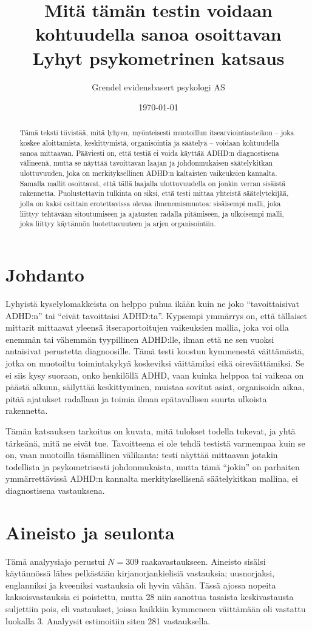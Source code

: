 \documentclass[11pt,a4paper]{article}
\title{Mitä tämän testin voidaan kohtuudella sanoa osoittavan\\
\large Lyhyt psykometrinen katsaus}
\author{Grendel evidensbasert psykologi AS}
\date{\today}
\begin{document}
\maketitle

\begin{abstract}
Tämä teksti tiivistää, mitä lyhyen, myönteisesti muotoillun itsearviointiasteikon -- joka koskee aloittamista, keskittymistä, organisointia ja säätelyä -- voidaan kohtuudella sanoa mittaavan. Pääviesti on, että testiä ei voida käyttää ADHD:n diagnostisena välineenä, mutta se näyttää tavoittavan laajan ja johdonmukaisen säätelykitkan ulottuvuuden, joka on merkityksellinen ADHD:n kaltaisten vaikeuksien kannalta. Samalla mallit osoittavat, että tällä laajalla ulottuvuudella on jonkin verran sisäistä rakennetta. Puolustettavin tulkinta on siksi, että testi mittaa yhteistä säätelytekijää, jolla on kaksi osittain erotettavissa olevaa ilmenemismuotoa: sisäisempi malli, joka liittyy tehtävään sitoutumiseen ja ajatusten radalla pitämiseen, ja ulkoisempi malli, joka liittyy käytännön luotettavuuteen ja arjen organisointiin.
\end{abstract}

\section{Johdanto}
Lyhyistä kyselylomakkeista on helppo puhua ikään kuin ne joko ``tavoittaisivat ADHD:n'' tai ``eivät tavoittaisi ADHD:ta''. Kypsempi ymmärrys on, että tällaiset mittarit mittaavat yleensä itseraportoitujen vaikeuksien mallia, joka voi olla enemmän tai vähemmän tyypillinen ADHD:lle, ilman että ne sen vuoksi antaisivat perustetta diagnoosille. Tämä testi koostuu kymmenestä väittämästä, jotka on muotoiltu toimintakykyä koskeviksi väittämiksi eikä oireväittämiksi. Se ei siis kysy suoraan, onko henkilöllä ADHD, vaan kuinka helppoa tai vaikeaa on päästä alkuun, säilyttää keskittyminen, muistaa sovitut asiat, organisoida aikaa, pitää ajatukset radallaan ja toimia ilman epätavallisen suurta ulkoista rakennetta.

Tämän katsauksen tarkoitus on kuvata, mitä tulokset todella tukevat, ja yhtä tärkeänä, mitä ne eivät tue. Tavoitteena ei ole tehdä testistä varmempaa kuin se on, vaan muotoilla täsmällinen välikanta: testi näyttää mittaavan jotakin todellista ja psykometrisesti johdonmukaista, mutta tämä ``jokin'' on parhaiten ymmärrettävissä ADHD:n kannalta merkityksellisenä säätelykitkan mallina, ei diagnostisena vastauksena.

\section{Aineisto ja seulonta}
Tämä analyysiajo perustui $N = 309$ raakavastaukseen. Aineisto sisälsi käytännössä lähes pelkästään kirjanorjankielisiä vastauksia; uusnorjaksi, englanniksi ja kveeniksi vastauksia oli hyvin vähän. Tässä ajossa nopeita kaksoisvastauksia ei poistettu, mutta 28 niin sanottua tasaista keskivastausta suljettiin pois, eli vastaukset, joissa kaikkiin kymmeneen väittämään oli vastattu luokalla 3. Analyysit estimoitiin siten 281 vastauksella.
\end{document}
